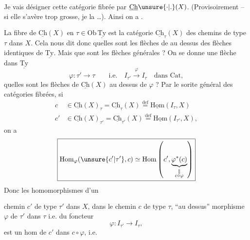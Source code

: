 Je vais  désigner cette catégorie fibrée par $\underline{\mathrm{Ch}}\unsure{\cdot|.}(X)$. (Provisoirement -- si elle s'avère trop grosse, je la \ldots). Ainsi on a
.

La fibre de $\underline{\mathrm{Ch}}(X)$ en $\tau\in\mathrm{Ob}\,\underline{\mathrm{Ty}}$ est la catégorie $\underline{\mathrm{Ch}}_\tau(X)$ des chemins de type $\tau$ dans $X$.  Cela nous dit donc quelles sont les flèches de  au dessus des flèches identiques de $\underline{\mathrm{Ty}}$. Mais que sont les flèches  générales ? On se donne une flèche dans $\underline{\mathrm{Ty}}$
\[ \varphi\colon\tau'\longrightarrow\tau\qquad\text{i.e.}\quad I_{\tau'}\xrightarrow{\varphi}I_\tau\quad\text{dans }\mathrm{Cat}, \]
quelles sont les flèches de $\underline{\mathrm{Ch}}(X)$ au dessus de $\varphi$ ? Par le sorite général des catégories fibrées, si
\[ \begin{aligned}
c&\in\underline{\mathrm{Ch}}(X)_\tau=\underline{\mathrm{Ch}}_\tau(X)\overset{\mathrm{def}}{=}\underline{\mathrm{Hom}}(I_\tau,X)\\
c'&\in\underline{\mathrm{Ch}}(X)_{\tau'}=\underline{\mathrm{Ch}}_{\tau'}(X)\overset{\mathrm{def}}{=}\underline{\mathrm{Hom}}(I_{\tau'},X),
\end{aligned} \]
on a
\[ \boxed{\mathrm{Hom}_\varphi(\unsure{c'|\tau'},c)\simeq\mathrm{Hom}\left(c',\underbrace{\varphi^*(c)}_{\substack{\Vert\\c\circ\varphi}}\right)} \]
Donc \unsure{!|:} les  homomorphismes d'un

chemin  $c'$ de type $\tau'$ dans $X$, dans le chemin $c$ de type $\tau$, ``au dessus''   morphisme $\varphi$ de $\tau'$ dans $\tau$ i.e. du foncteur
\[ \varphi\colon I_{\tau'}\longrightarrow I_\tau, \]
est un hom  de $c'$ dans $c\circ\varphi$, i.e.

